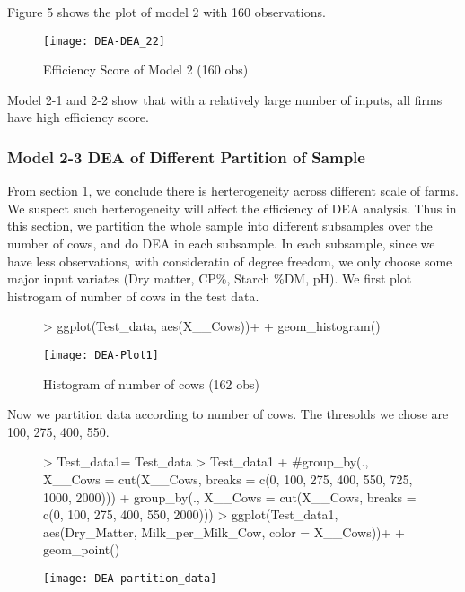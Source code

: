 \documentclass[12pt,]{article}
\begin{document}
Figure 5 shows the plot of model 2 with 160 observations.
\begin{figure}[h]
\texttt{[image: DEA-DEA\_22]}
\caption{Efficiency Score of Model 2 (160 obs)}
\end{figure}

Model 2-1 and 2-2 show that with a relatively large number of inputs, all firms have high efficiency score. 


\subsubsection{Model 2-3 DEA of Different Partition of Sample}
From section 1, we conclude there is herterogeneity across different scale of farms. We suspect such herterogeneity will affect the efficiency of DEA analysis. Thus in this section, we partition the whole sample into different subsamples over the number of cows, and do DEA in each subsample. In each subsample, since we have less observations, with consideratin of degree freedom, we only choose some major input variates (Dry matter, CP\%, Starch \%DM, pH). We first plot histrogam of number of cows in the test data.

\begin{figure}[h]
\begin{Schunk}
\begin{Sinput}
> ggplot(Test_data, aes(X__Cows))+
+   geom_histogram()
\end{Sinput}
\end{Schunk}
\texttt{[image: DEA-Plot1]}
\caption{Histogram of number of cows (162 obs)}
\end{figure}

Now we partition data according to number of cows. The thresolds we chose are 100, 275, 400, 550.
\begin{figure}[h]
\begin{Schunk}
\begin{Sinput}
> Test_data1= Test_data
> Test_data1%<>%
+   #group_by(., X__Cows = cut(X__Cows, breaks = c(0, 100, 275, 400, 550, 725, 1000, 2000)))
+     group_by(., X__Cows = cut(X__Cows, breaks = c(0, 100, 275, 400, 550, 2000)))
> ggplot(Test_data1, aes(Dry_Matter, Milk_per_Milk_Cow, color = X__Cows))+
+   geom_point()
\end{Sinput}
\end{Schunk}
\texttt{[image: DEA-partition\_data]}
\end{figure}
\end{document}
